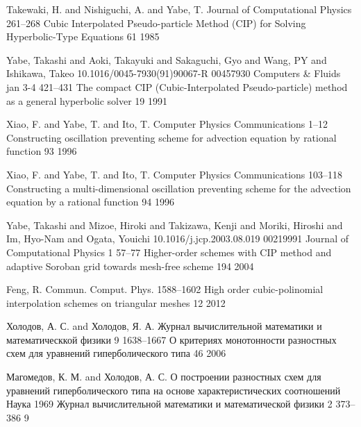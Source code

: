 \documentclass[11pt]{article}
\begin{document}
\begin{thebibliography}{99}
Takewaki, H. and Nishiguchi, A. and Yabe, T. Journal of Computational Physics 261--268 Cubic Interpolated Pseudo-particle Method (CIP) for Solving Hyperbolic-Type Equations 61 1985

Yabe, Takashi and Aoki, Takayuki and Sakaguchi, Gyo and Wang, PY and Ishikawa, Takeo 10.1016/0045-7930(91)90067-R 00457930 Computers \& Fluids jan 3-4 421--431 The compact CIP (Cubic-Interpolated Pseudo-particle) method as a general hyperbolic solver 19 1991

Xiao, F. and Yabe, T. and Ito, T. Computer Physics Communications 1--12 Constructing oscillation preventing scheme for advection equation by rational function 93 1996

Xiao, F. and Yabe, T. and Ito, T. Computer Physics Communications 103--118 Constructing a multi-dimensional oscillation preventing scheme for the advection equation by a rational function 94 1996

Yabe, Takashi and Mizoe, Hiroki and Takizawa, Kenji and Moriki, Hiroshi and Im, Hyo-Nam and Ogata, Youichi 10.1016/j.jcp.2003.08.019 00219991 Journal of Computational Physics 1 57--77 Higher-order schemes with CIP method and adaptive Soroban grid towards mesh-free scheme 194 2004

Feng, R. Commun. Comput. Phys. 1588--1602 High order cubic-polinomial interpolation schemes on triangular meshes 12 2012

Холодов, А. С. and Холодов, Я. А. Журнал вычислительной математики и математическкой физики 9 1638--1667 О критериях монотонности разностных схем для уравнений гиперболического типа 46 2006

Магомедов, К. М. and Холодов, А. С. О построении разностных схем для уравнений гиперболического типа на основе характеристических соотношений Наука 1969 Журнал вычислительной математики и математической физики 2 373--386 9




\end{thebibliography}
\end{document}
